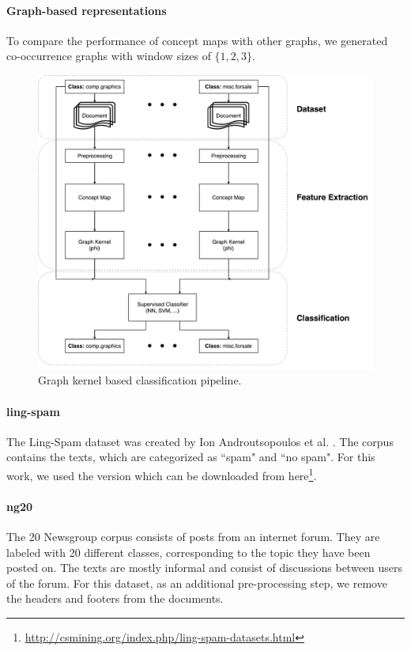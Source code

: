 
\paragraph{Graph-based representations}
To compare the performance of concept maps with other graphs, we generated co-occurrence graphs with window sizes of $\{1, 2, 3\}$.


\begin{figure}[ht]
\centering\includegraphics[width=0.6\linewidth]{assets/figures/approach.pdf}
\caption{Graph kernel based classification pipeline.}
\end{figure}


\paragraph{ling-spam}
The Ling-Spam dataset was created by Ion Androutsopoulos et al. \cite{Androutsopoulos2000}.
The corpus contains the texts, which are categorized as ``spam" and ``no spam". For this work, we used the version which can be downloaded from here\footnote{\url{http://csmining.org/index.php/ling-spam-datasets.html}}.

\paragraph{ng20}
The 20 Newsgroup corpus \cite{Lang} consists of posts from an internet forum. They are labeled with 20 different classes, corresponding to the topic they have been posted on. The texts are mostly informal and consist of discussions between users of the forum.
For this dataset, as an additional pre-processing step, we remove the headers and footers from the documents.

